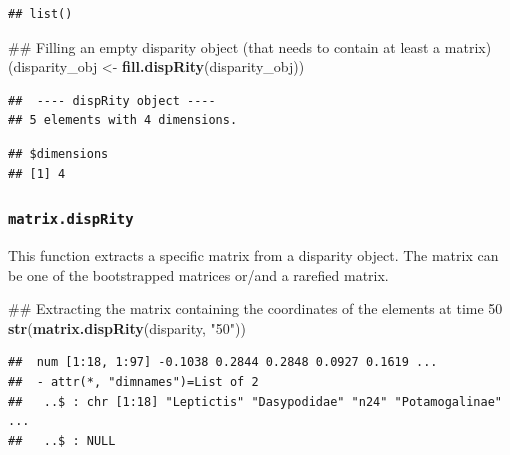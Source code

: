\documentclass[]{book}
\newenvironment{Shaded}{\begin{snugshade}}{\end{snugshade}}
\newcommand{\KeywordTok}[1]{\textcolor[rgb]{0.13,0.29,0.53}{\textbf{#1}}}
\newcommand{\StringTok}[1]{\textcolor[rgb]{0.31,0.60,0.02}{#1}}
\newcommand{\OperatorTok}[1]{\textcolor[rgb]{0.81,0.36,0.00}{\textbf{#1}}}
\newcommand{\NormalTok}[1]{#1}
\theoremstyle{definition}
\theoremstyle{definition}
\theoremstyle{definition}
\theoremstyle{remark}
\begin{document}
\begin{verbatim}
## list()
\end{verbatim}

\begin{Shaded}
\begin{Highlighting}[]
\NormalTok{## Filling an empty disparity object (that needs to contain at least a matrix)}
\NormalTok{(disparity_obj <-}\StringTok{ }\KeywordTok{fill.dispRity}\NormalTok{(disparity_obj))}
\end{Highlighting}
\end{Shaded}

\begin{verbatim}
##  ---- dispRity object ---- 
## 5 elements with 4 dimensions.
\end{verbatim}

\begin{Shaded}
\end{Shaded}

\begin{verbatim}
## $dimensions
## [1] 4
\end{verbatim}

\subsubsection{\texorpdfstring{\texttt{matrix.dispRity}}{matrix.dispRity}}\label{matrix.disprity}

This function extracts a specific matrix from a disparity object. The
matrix can be one of the bootstrapped matrices or/and a rarefied matrix.

\begin{Shaded}
\begin{Highlighting}[]
\NormalTok{## Extracting the matrix containing the coordinates of the elements at time 50}
\KeywordTok{str}\NormalTok{(}\KeywordTok{matrix.dispRity}\NormalTok{(disparity, }\StringTok{"50"}\NormalTok{))}
\end{Highlighting}
\end{Shaded}

\begin{verbatim}
##  num [1:18, 1:97] -0.1038 0.2844 0.2848 0.0927 0.1619 ...
##  - attr(*, "dimnames")=List of 2
##   ..$ : chr [1:18] "Leptictis" "Dasypodidae" "n24" "Potamogalinae" ...
##   ..$ : NULL
\end{verbatim}
\end{document}
